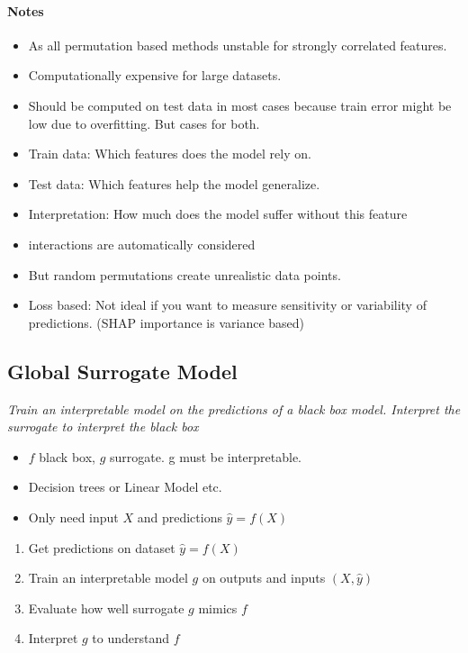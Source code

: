 \paragraph{Notes}
\begin{itemize}
	\item As all permutation based methods unstable for strongly correlated features.
	\item Computationally expensive for large datasets.
	\item Should be computed on test data in most cases because train error might be low due to overfitting. But cases for both.
	\item Train data: Which features does the model rely on.
	\item Test data: Which features help the model generalize.
	\item Interpretation: How much does the model suffer without this feature
	\item interactions are automatically considered
	\item But random permutations create unrealistic data points.
	\item Loss based: Not ideal if you want to measure sensitivity or variability of predictions. (SHAP importance is variance based)
\end{itemize}


\subsection{Global Surrogate Model}
\textit{Train an interpretable model on the predictions of a black box model. Interpret the surrogate to interpret the black box}

\begin{itemize}
	\item $f$ black box, $g$ surrogate. g must be interpretable.
	\item Decision trees or Linear Model etc.
	\item Only need input $X$ and predictions $\hat y = f(X)$
\end{itemize}


\begin{enumerate}
	\item Get predictions on dataset $\hat y = f(X)$
	\item Train an interpretable model $g$ on outputs and inputs $(X, \hat y)$
	\item Evaluate how well surrogate $g$ mimics $f$
	\item Interpret $g$ to understand $f$
\end{enumerate}

